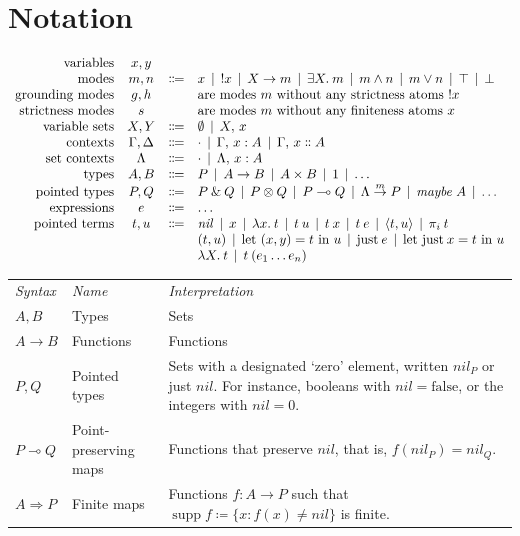 \documentclass[11pt]{article}
\DeclareMathOperator{\support}{supp}
\newcommand\bnfeq{\Coloneqq}
\newcommand\bnfor{\mathrel{\,|\,}}
\newcommand\defeq{\coloneqq}
\newcommand\name[1]{\ensuremath{\mathit{#1}}}
\newcommand\<\:                 %
\newcommand\fnspace{\<}         %
\newcommand\fn[1]{\lambda{#1}.\fnspace}
\newcommand\ex[1]{\exists{#1}.\fnspace}
\newcommand\lto\multimap        %
\newcommand\fto\Rightarrow
\newcommand\with{\mathbin{\&}}
\newcommand\ox\otimes
\newcommand\typename\textit
\newcommand\maybe{\typename{maybe}}
\newcommand\maybeof[1]{\ensuremath{\maybe~{#1}}}
\newcommand\G{\mathrm{\Gamma}}
\newcommand\D{\mathrm{\Delta}}
\renewcommand\L{\mathrm{\Lambda}}
\renewcommand\G\Gamma
\renewcommand\D\Delta
\renewcommand\L{\Lambda}
\newcommand\emptycx{{\cdot}}
\newcommand\hyp[2]{{#1} : {#2}}          %
\newcommand\phyp[2]{{#1} \dblcolon {#2}} %
\newcommand\kword[1]{\ensuremath{\textrm{#1}}}
\newcommand\cname\textrm        %
\newcommand\cnil{\cname{none}}
\newcommand\cjust{\cname{just}}
\newcommand\nil{\name{nil}}
\newcommand\letin[1]{\kword{let}~{#1}~\kword{in}~}
\newcommand\leteq[2]{\letin{{#1} = {#2}}}
\newcommand\tjust[1]{\cjust\<{#1}}
\newcommand\letjust[3]{\leteq{\tjust {#1}}{#2}{#3}}
\newcommand\letpair[4]{\leteq{({#1}, {#2})}{#3}{#4}}
\newcommand\withpair[1]{\ensuremath{\langle{#1}\rangle}}
\newcommand\ifjust[4]{%
  \kword{case}~{#1}\ \kword{of}\
  \cjust~{#2} \shortrightarrow {#3};\, \cnil \shortrightarrow {#4}%
}
\newcommand\typeforget{}
\newcommand\termforget[1]{#1}
\newcommand\mstrict[1]{\ensuremath{{!{#1}}}}
\newcommand\many\top
\newcommand\mnone\bot
\newcommand\mand\wedge
\newcommand\mplus\vee
\newcommand\mto\to              %
\newcommand\mex[1]{\ex{#1}}
\newcommand\mfun[3]{{#1}_{#2} \!\to {#3}}
\renewcommand\mfun[3]{{#1} \overset{#2}{\to} {#3}}
\newcommand\multiarg[1]{({#1})}
\newcommand\multiapp[2]{{#1}\<\multiarg{#2}}
\begin{document}
\section{Notation}

\[
\begin{array}{rccll}
  \text{variables} & x,y
  \\
  \text{modes} & m,n &\bnfeq&
  x
  \bnfor \mstrict x
  \bnfor X \mto m
  \bnfor \mex X m
  \bnfor m \mand n \bnfor m \mplus n
  \bnfor \many \bnfor \mnone
  \\
  \text{grounding modes} & g,h &&
  \text{are modes $m$ without any strictness atoms $\mstrict x$}
  \\
  \text{strictness modes} & s &&
  \text{are modes $m$ without any finiteness atoms $x$}
  \\
  \text{variable sets} & X,Y &\bnfeq& \emptyset \bnfor X,\, x
  \\
  \text{contexts} & \G,\D &\bnfeq& \emptycx
  \bnfor \G,\, \hyp x A \bnfor \G,\, \phyp x A
  \\
  \text{set contexts} & \L &\bnfeq& \emptycx \bnfor \L,\, \hyp x A
  \\
  \text{types} & A,B &\bnfeq&
  \typeforget P \bnfor A \to B \bnfor A \times B \bnfor 1 \bnfor \dots\\
  \text{pointed types} & P,Q &\bnfeq&
  P \with Q \bnfor P \ox Q \bnfor P \lto Q
  \bnfor \mfun \L m P
  \bnfor
  \maybeof A
  \bnfor \dots
  \\
  \text{expressions} & e &\bnfeq&
  \dots
  \\
  \text{pointed terms} & t,u &\bnfeq&
  \nil
  \bnfor x \bnfor \fn{x} t \bnfor t\<u
  \bnfor t\<x \bnfor t\<e
  \bnfor \withpair{t, u} \bnfor \pi_i \<t
  \\
  &&& (t,u) \bnfor \letpair x y t u
  \bnfor \tjust e \bnfor \letjust x t u
  \\
  &&& \fn X t \bnfor \multiapp t {e_1 \dots e_n}
\end{array}
\]

\noindent%
\begin{tabular}{llp{86mm}}%
  \it Syntax & \it Name & \it Interpretation\\
  $A,B$ & Types & Sets\\
  $A \to B$ & Functions & Functions\\
  $P,Q$ & Pointed types & Sets with a designated `zero' element, written $\nil_P$ or just $\nil$.
  For instance, booleans with $\nil = \text{false}$, or the integers with $\nil = 0$.
  \\
  $P \lto Q$ & Point-preserving maps & Functions that preserve $\nil$, that is, $f(\nil_P) = \nil_Q$.
  \\
  $A \fto P$ & Finite maps &
  Functions $f : A \to P$ such that $\support{f} \defeq \{ x : f(x) \ne \nil \}$ is finite.
\end{tabular}
\end{document}
